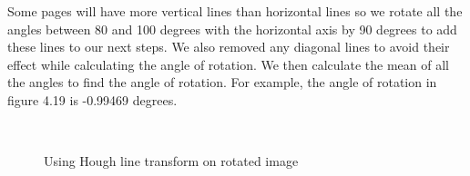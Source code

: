 Some pages will have more vertical lines than horizontal lines so we rotate all the angles between 80 and 100 degrees with the horizontal axis by 90 degrees to add these lines to our next steps. We also removed any diagonal lines to avoid their effect while calculating the angle of rotation. We then calculate the mean of all the angles to find the angle of rotation. For example, the angle of rotation in figure 4.19 is -0.99469 degrees. \\



\begin{figure}[H]
\centering
{}\hfill
{}\\
\caption{Using Hough line transform on rotated image}
\label{fig:num1235}
\end{figure}

